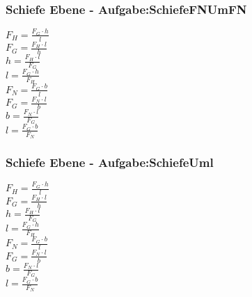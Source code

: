 \subsubsection{Schiefe Ebene - Aufgabe:SchiefeFNUmFN} 
\begin{minipage}{0.45\textwidth} 
$ F_{H}  = \frac{F_{G} \cdot h}{ l} $\\ 
$ F_{G}  = \frac{F_{H} \cdot l}{ h} $\\ 
$ h = \frac{F_{H} \cdot l}{ F_{G} } $\\ 
$ l = \frac{F_{G} \cdot h}{ F_{H} } $\\ 
$ F_{N}  = \frac{F_{G} \cdot b}{ l} $\\ 
$ F_{G}  = \frac{F_{N} \cdot l}{ b} $\\ 
$ b = \frac{F_{N} \cdot l}{ F_{G} } $\\ 
$ l = \frac{F_{G} \cdot b}{ F_{N} } $\\ 
\end{minipage} 
\begin{minipage}{0.45\textwidth} 
 
\end{minipage} 
\subsubsection{Schiefe Ebene - Aufgabe:SchiefeUml} 
\begin{minipage}{0.45\textwidth} 
$ F_{H}  = \frac{F_{G} \cdot h}{ l} $\\ 
$ F_{G}  = \frac{F_{H} \cdot l}{ h} $\\ 
$ h = \frac{F_{H} \cdot l}{ F_{G} } $\\ 
$ l = \frac{F_{G} \cdot h}{ F_{H} } $\\ 
$ F_{N}  = \frac{F_{G} \cdot b}{ l} $\\ 
$ F_{G}  = \frac{F_{N} \cdot l}{ b} $\\ 
$ b = \frac{F_{N} \cdot l}{ F_{G} } $\\ 
$ l = \frac{F_{G} \cdot b}{ F_{N} } $\\ 
\end{minipage} 
\begin{minipage}{0.45\textwidth} 
 
\end{minipage} 
